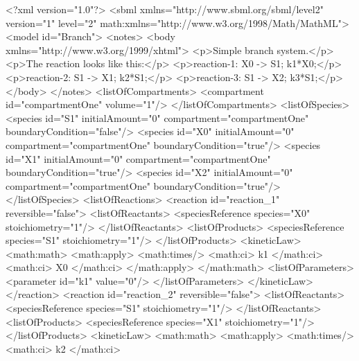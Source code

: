 \documentclass[10pt,twocolumntoc]{cekarticle}
\begin{document}
\begin{example}
<?xml version="1.0"?>
<sbml xmlns="http://www.sbml.org/sbml/level2" version="1" level="2"
      math:xmlns="http://www.w3.org/1998/Math/MathML">
    <model id="Branch">
        <notes>
            <body xmlns="http://www.w3.org/1999/xhtml">
                <p>Simple branch system.</p>
                <p>The reaction looks like this:</p>
                <p>reaction-1:   X0 -> S1; k1*X0;</p>
                <p>reaction-2:   S1 -> X1; k2*S1;</p>
                <p>reaction-3:   S1 -> X2; k3*S1;</p>
            </body>
        </notes>
        <listOfCompartments>
            <compartment id="compartmentOne" volume="1"/>
        </listOfCompartments>
        <listOfSpecies>
            <species id="S1" initialAmount="0" compartment="compartmentOne"
                    boundaryCondition="false"/>
            <species id="X0" initialAmount="0" compartment="compartmentOne"
                    boundaryCondition="true"/>
            <species id="X1" initialAmount="0" compartment="compartmentOne"
                    boundaryCondition="true"/>
            <species id="X2" initialAmount="0" compartment="compartmentOne"
                    boundaryCondition="true"/>
        </listOfSpecies>
        <listOfReactions>
            <reaction id="reaction_1" reversible="false">
                <listOfReactants>
                    <speciesReference species="X0" stoichiometry="1"/>
                </listOfReactants>
                <listOfProducts>
                    <speciesReference species="S1" stoichiometry="1"/>
                </listOfProducts>
                <kineticLaw>
                    <math:math>
                        <math:apply>
                            <math:times/>
                            <math:ci> k1 </math:ci>
                            <math:ci> X0 </math:ci>
                        </math:apply>
                    </math:math>
                    <listOfParameters>
                        <parameter id="k1" value="0"/>
                    </listOfParameters>
                </kineticLaw>
            </reaction>
            <reaction id="reaction_2" reversible="false">
                <listOfReactants>
                    <speciesReference species="S1" stoichiometry="1"/>
                </listOfReactants>
                <listOfProducts>
                    <speciesReference species="X1" stoichiometry="1"/>
                </listOfProducts>
                <kineticLaw>
                    <math:math>
                        <math:apply>
                            <math:times/>
                            <math:ci> k2 </math:ci>

\end{example}
\end{document}
